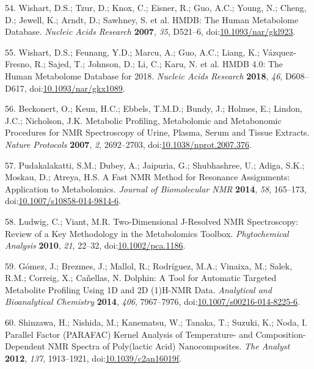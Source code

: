 \documentclass[]{article}
\begin{document}
\leavevmode\hypertarget{ref-wishart_2007}{}%
54. Wishart, D.S.; Tzur, D.; Knox, C.; Eisner, R.; Guo, A.C.; Young, N.; Cheng, D.; Jewell, K.; Arndt, D.; Sawhney, S. et al. HMDB: The Human Metabolome Database. \emph{Nucleic Acids Research} \textbf{2007}, \emph{35}, D521--6, doi:\href{https://doi.org/10.1093/nar/gkl923}{10.1093/nar/gkl923}.

\leavevmode\hypertarget{ref-wishart_2018}{}%
55. Wishart, D.S.; Feunang, Y.D.; Marcu, A.; Guo, A.C.; Liang, K.; Vázquez-Fresno, R.; Sajed, T.; Johnson, D.; Li, C.; Karu, N. et al. HMDB 4.0: The Human Metabolome Database for 2018. \emph{Nucleic Acids Research} \textbf{2018}, \emph{46}, D608--D617, doi:\href{https://doi.org/10.1093/nar/gkx1089}{10.1093/nar/gkx1089}.

\leavevmode\hypertarget{ref-beckonert_2007}{}%
56. Beckonert, O.; Keun, H.C.; Ebbels, T.M.D.; Bundy, J.; Holmes, E.; Lindon, J.C.; Nicholson, J.K. Metabolic Profiling, Metabolomic and Metabonomic Procedures for NMR Spectroscopy of Urine, Plasma, Serum and Tissue Extracts. \emph{Nature Protocols} \textbf{2007}, \emph{2}, 2692--2703, doi:\href{https://doi.org/10.1038/nprot.2007.376}{10.1038/nprot.2007.376}.

\leavevmode\hypertarget{ref-pudakalakatti_2014}{}%
57. Pudakalakatti, S.M.; Dubey, A.; Jaipuria, G.; Shubhashree, U.; Adiga, S.K.; Moskau, D.; Atreya, H.S. A Fast NMR Method for Resonance Assignments: Application to Metabolomics. \emph{Journal of Biomolecular NMR} \textbf{2014}, \emph{58}, 165--173, doi:\href{https://doi.org/10.1007/s10858-014-9814-6}{10.1007/s10858-014-9814-6}.

\leavevmode\hypertarget{ref-ludwig_2010}{}%
58. Ludwig, C.; Viant, M.R. Two-Dimensional J-Resolved NMR Spectroscopy: Review of a Key Methodology in the Metabolomics Toolbox. \emph{Phytochemical Analysis} \textbf{2010}, \emph{21}, 22--32, doi:\href{https://doi.org/10.1002/pca.1186}{10.1002/pca.1186}.

\leavevmode\hypertarget{ref-gmez_2014}{}%
59. Gómez, J.; Brezmes, J.; Mallol, R.; Rodríguez, M.A.; Vinaixa, M.; Salek, R.M.; Correig, X.; Cañellas, N. Dolphin: A Tool for Automatic Targeted Metabolite Profiling Using 1D and 2D (1)H-NMR Data. \emph{Analytical and Bioanalytical Chemistry} \textbf{2014}, \emph{406}, 7967--7976, doi:\href{https://doi.org/10.1007/s00216-014-8225-6}{10.1007/s00216-014-8225-6}.

\leavevmode\hypertarget{ref-shinzawa_2012}{}%
60. Shinzawa, H.; Nishida, M.; Kanematsu, W.; Tanaka, T.; Suzuki, K.; Noda, I. Parallel Factor (PARAFAC) Kernel Analysis of Temperature- and Composition-Dependent NMR Spectra of Poly(lactic Acid) Nanocomposites. \emph{The Analyst} \textbf{2012}, \emph{137}, 1913--1921, doi:\href{https://doi.org/10.1039/c2an16019f}{10.1039/c2an16019f}.
\end{document}
